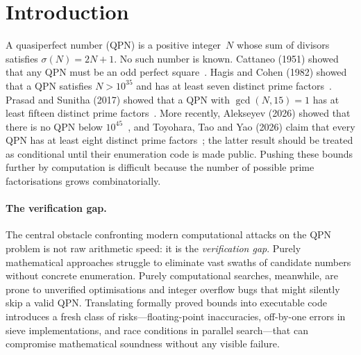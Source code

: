 \section{Introduction}
\label{sec:intro}

A quasiperfect number (QPN) is a positive integer~$N$ whose sum of
divisors satisfies $\sigma(N) = 2N + 1$.  No such number is known.
Cattaneo (1951) showed that any QPN must be an odd perfect
square~\cite{cattaneo1951}.  Hagis and Cohen (1982) showed that a QPN
satisfies $N > 10^{35}$ and has at least seven distinct prime
factors~\cite{hagis1982}.  Prasad and Sunitha (2017) showed that a QPN
with $\gcd(N,15)=1$ has at least fifteen distinct prime
factors~\cite{prasad_sunitha}.  More recently, Alekseyev (2026) showed
that there is no QPN below $10^{45}$~\cite{alekseyev2026}, and
Toyohara, Tao and Yao (2026) claim that every QPN has at least eight
distinct prime factors~\cite{toyohara_tao_yao2026}; the latter result
should be treated as conditional until their enumeration code is made
public.  Pushing these bounds further by computation is difficult
because the number of possible prime factorisations grows
combinatorially.

\paragraph{The verification gap.}
The central obstacle confronting modern computational attacks on the QPN
problem is not raw arithmetic speed: it is the \emph{verification gap}.
Purely mathematical approaches struggle to eliminate vast swaths of
candidate numbers without concrete enumeration.  Purely computational
searches, meanwhile, are prone to unverified optimisations and integer
overflow bugs that might silently skip a valid QPN\@.  Translating
formally proved bounds into executable code introduces a fresh class of
risks---floating-point inaccuracies, off-by-one errors in sieve
implementations, and race conditions in parallel search---that can
compromise mathematical soundness without any visible failure.

